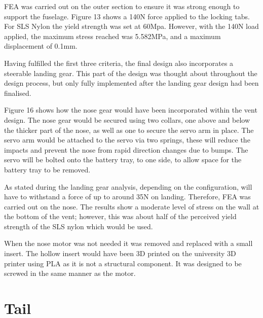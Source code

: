 \documentclass[../../main.tex]{subfiles}
\begin{document}

FEA was carried out on the outer section to ensure it was strong enough to support the fuselage.
Figure 13 shows a 140N force applied to the locking tabs.
For SLS Nylon the yield strength was set at 60Mpa.
However, with the 140N load applied, the maximum stress reached was 5.582MPa, and a maximum displacement of 0.1mm. 

Having fulfilled the first three criteria, the final design also incorporates a steerable landing gear.
This part of the design was thought about throughout the design process, but only fully implemented after the landing gear design had been finalised. 


Figure 16 shows how the nose gear would have been incorporated within the vent design.
The nose gear would be secured using two collars, one above and below the thicker part of the nose, as well as one to secure the servo arm in place.
The servo arm would be attached to the servo via two springs, these will reduce the impacts and prevent the nose from rapid direction changes due to bumps.
The servo will be bolted onto the battery tray, to one side, to allow space for the battery tray to be removed. 

As stated during the landing gear analysis, depending on the configuration, will have to withstand a force of up to around 35N on landing.
Therefore, FEA was carried out on the nose.
The results show a moderate level of stress on the wall at the bottom of the vent; however, this was about half of the perceived yield strength of the SLS nylon which would be used. 


When the nose motor was not needed it was removed and replaced with a small insert.
The hollow insert would have been 3D printed on the university 3D printer using PLA as it is not a structural component.
It was designed to be screwed in the same manner as the motor. 


\section{Tail} \label{sec:final-design-proposal:tail}
\end{document}
